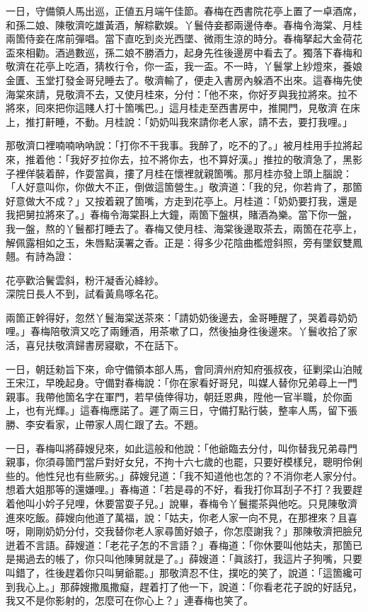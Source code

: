 一日，守備領人馬出巡，正値五月端午佳節。春梅在西書院花亭上置了一卓酒席，和孫二娘、陳敬濟吃雄黃酒，解粽歡娛。{}丫鬟侍妾都兩邊侍奉。春梅令海棠、月桂兩箇侍妾在席前彈唱。當下直吃到炎光西墜、微雨生涼的時分。春梅拏起大金荷花盃來相勸。酒過數巡，孫二娘不勝酒力，起身先徃後邊房中看去了。獨落下春梅和敬濟在花亭上吃酒，猜枚行令，你一盃，我一盃。不一時，丫鬟掌上紗燈來，養娘金匱、玉堂打發金哥兒睡去了。敬濟輸了，便走入書房內躲酒不出來。這春梅先使海棠來請，見敬濟不去，又使月桂來，分付：「他不來，你好歹與我拉將來。拉不將來，囘來把你這賤人打十箇嘴巴。」這月桂走至西書房中，推開門，見敬濟𢱉在床上，推打鼾睡，不動。月桂說：「奶奶叫我來請你老人家，請不去，要打我哩。」

那敬濟口裡喃喃吶吶說：「打你不干我事。{}我醉了，吃不的了。」被月桂用手拉將起來，推着他：「我好歹拉你去，拉不將你去，也不算好漢。」推拉的敬濟急了，黑影子裡佯裝着醉，作耍當眞，摟了月桂在懷裡就親箇嘴。那月桂亦發上頭上腦說：「人好意叫你，你做大不正，倒做這箇營生。」敬濟道：「我的兒，你若肯了，那箇好意做大不成？」又按着親了箇嘴，方走到花亭上。月桂道：「奶奶要打我，還是我把舅拉將來了。」春梅令海棠斟上大鐘，兩箇下盤棋，賭酒為樂。當下你一盤，我一盤，熬的丫鬟都打睡去了。春梅又使月桂、海棠後邊取茶去，兩箇在花亭上，解佩露相如之玉，朱唇點漢署之香。正是：得多少花陰曲檻燈斜照，旁有墜釵雙鳳翹。有詩為證：

\begin{myquote}
花亭歡洽鬢雲斜，粉汗凝香沁絳紗。\\深院日長人不到，試看黃鳥啄名花。
\end{myquote}

兩箇正幹得好，忽然丫鬟海棠送茶來：「請奶奶後邊去，金哥睡醒了，哭着尋奶奶哩。」春梅陪敬濟又吃了兩鍾酒，用茶嗽了口，然後抽身徃後邊來。丫鬟收拾了家活，喜兒扶敬濟歸書房寢歇，不在話下。

一日，朝廷勑旨下來，命守備領本部人馬，會同濟州府知府張叔夜，征剿梁山泊賊王宋江，早晚起身。守備對春梅說：「你在家看好哥兒，叫媒人替你兄弟尋上一門親事。我帶他箇名字在軍門，若早僥倖得功，朝廷恩典，陞他一官半職，於你面上，也有光輝。」{}這春梅應諾了。遲了兩三日，守備打點行裝，整率人馬，留下張勝、李安看家，止帶家人周仁跟了去。不題。

一日，春梅叫將薛嫂兒來，如此這般和他說：「他爺臨去分付，叫你替我兄弟尋門親事，你須尋箇門當戶對好女兒，不拘十六七歲的也罷，只要好模樣兒，聰明伶俐些的。他性兒也有些厥劣。」薛嫂兒道：「我不知道他也怎的？不消你老人家分付。想着大姐那等的還嫌哩。」春梅道：「若是尋的不好，看我打你耳刮子不打？我要趕着他叫小妗子兒哩，休要當耍子兒。」說畢，春梅令丫鬟擺茶與他吃。只見陳敬濟進來吃飯。薛嫂向他道了萬福，說：「姑夫，你老人家一向不見，在那裡來？且喜呀，剛剛奶奶分付，交我替你老人家尋箇好娘子，你怎麼謝我？」那陳敬濟把臉兒迸着不言語。{}薛嫂道：「老花子怎的不言語？」春梅道：「你休要叫他姑夫，那箇已是揭過去的帳了，你只叫他陳舅就是了。」薛嫂道：「眞該打，我這片子狗嘴，只要叫錯了，徃後趕着你只叫舅爺罷。」那敬濟忍不住，撲吃的笑了，說道：「這箇纔可到我心上。」{}那薛嫂撒風撒癡，趕着打了他一下，說道：「你看老花子說的好話兒，我又不是你影射的，怎麼可在你心上？」連春梅也笑了。

